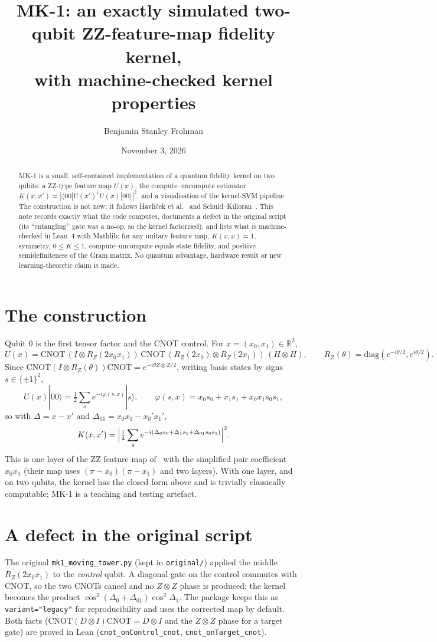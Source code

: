 \documentclass[11pt]{article}
\title{MK-1: an exactly simulated two-qubit ZZ-feature-map fidelity kernel,\\ with machine-checked kernel properties}
\author{Benjamin Stanley Frohman}
\date{November 3, 2026}
\begin{document}
\maketitle
{}\par

\begin{abstract}
MK-1 is a small, self-contained implementation of a quantum fidelity kernel on two qubits:
a ZZ-type feature map $U(x)$, the compute--uncompute estimator $K(x,x')=|\langle 00|U(x')^\dagger U(x)|00\rangle|^2$,
and a visualisation of the kernel-SVM pipeline. The construction is not new; it follows Havl\'{\i}\v{c}ek et al.~\cite{havlicek} and Schuld--Killoran~\cite{schuld}.
This note records exactly what the code computes, documents a defect in the original script (its ``entangling'' gate
was a no-op, so the kernel factorised), and lists what is machine-checked in Lean~4 with Mathlib: for any unitary feature map,
$K(x,x)=1$, symmetry, $0\le K\le 1$, compute--uncompute equals state fidelity, and positive semidefiniteness of the Gram matrix.
No quantum advantage, hardware result or new learning-theoretic claim is made.
\end{abstract}

\section{The construction}
Qubit 0 is the first tensor factor and the CNOT control. For $x=(x_0,x_1)\in\mathbb{R}^2$,
\[
U(x)=\mathrm{CNOT}\,(I\otimes R_Z(2x_0x_1))\,\mathrm{CNOT}\,(R_Z(2x_0)\otimes R_Z(2x_1))\,(H\otimes H),
\qquad R_Z(\theta)=\mathrm{diag}(e^{-i\theta/2},e^{i\theta/2}).
\]
Since $\mathrm{CNOT}(I\otimes R_Z(\theta))\mathrm{CNOT}=e^{-i\theta Z\otimes Z/2}$, writing basis states by signs $s\in\{\pm1\}^2$,
\[
U(x)|00\rangle=\tfrac12\sum_{s} e^{-i\varphi(s,x)}|s\rangle,\qquad \varphi(s,x)=x_0s_0+x_1s_1+x_0x_1s_0s_1,
\]
so with $\Delta=x-x'$ and $\Delta_{01}=x_0x_1-x_0'x_1'$,
\[
K(x,x')=\Bigl|\tfrac14\sum_{s}e^{-i(\Delta_0s_0+\Delta_1s_1+\Delta_{01}s_0s_1)}\Bigr|^2 .
\]
This is one layer of the ZZ feature map of~\cite{havlicek} with the simplified pair coefficient $x_0x_1$
(their map uses $(\pi-x_0)(\pi-x_1)$ and two layers). With one layer, and on two qubits, the kernel has the
closed form above and is trivially classically computable; MK-1 is a teaching and testing artefact.

\section{A defect in the original script}
The original \texttt{mk1\_moving\_tower.py} (kept in \texttt{original/}) applied the middle $R_Z(2x_0x_1)$ to the \emph{control} qubit.
A diagonal gate on the control commutes with CNOT, so the two CNOTs cancel and no $Z\otimes Z$ phase is produced; the kernel becomes the
product $\cos^2(\Delta_0+\Delta_{01})\cos^2\Delta_1$. The package keeps this as \texttt{variant="legacy"} for reproducibility and uses
the corrected map by default. Both facts ($\mathrm{CNOT}(D\otimes I)\mathrm{CNOT}=D\otimes I$ and the $Z\otimes Z$ phase for a target gate)
are proved in Lean (\texttt{cnot\_onControl\_cnot}, \texttt{cnot\_onTarget\_cnot}).
\end{document}

